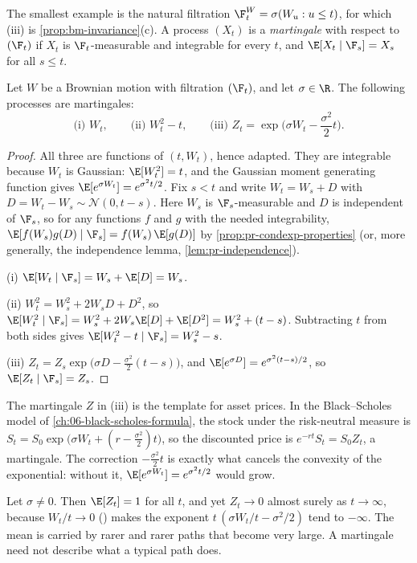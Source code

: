 The smallest example is the natural filtration $\F^W_t=\sigma(W_u:u\le t)$, for which
(iii) is \cref{prop:bm-invariance}(c). A process $(X_t)$ is a \emph{martingale} with
respect to $(\F_t)$ if $X_t$ is $\F_t$-measurable and integrable for every $t$, and
$\E[X_t\mid\F_s]=X_s$ for all $s\le t$.

\begin{theorem}\label{thm:bm-martingales}
Let $W$ be a Brownian motion with filtration $(\F_t)$, and let $\sigma\in\R$. The
following processes are martingales:
\[
  \text{(i) } W_t,\qquad
  \text{(ii) } W_t^2-t,\qquad
  \text{(iii) } Z_t=\exp\!\Big(\sigma W_t-\frac{\sigma^2}{2}t\Big).
\]
\end{theorem}

\begin{proof}
All three are functions of $(t,W_t)$, hence adapted. They are integrable because $W_t$
is Gaussian: $\E[W_t^2]=t$, and the Gaussian moment generating function gives
$\E[e^{\sigma W_t}]=e^{\sigma^2t/2}$. Fix $s<t$ and write $W_t=W_s+D$ with
$D=W_t-W_s\sim\mathcal N(0,t-s)$. Here $W_s$ is $\F_s$-measurable and $D$ is independent
of $\F_s$, so for any functions $f$ and $g$ with the needed integrability,
$\E[f(W_s)g(D)\mid\F_s]=f(W_s)\,\E[g(D)]$ by \cref{prop:pr-condexp-properties} (or, more
generally, the independence lemma, \cref{lem:pr-independence}).

(i) $\E[W_t\mid\F_s]=W_s+\E[D]=W_s$.

(ii) $W_t^2=W_s^2+2W_sD+D^2$, so $\E[W_t^2\mid\F_s]=W_s^2+2W_s\E[D]+\E[D^2]=W_s^2+(t-s)$.
Subtracting $t$ from both sides gives $\E[W_t^2-t\mid\F_s]=W_s^2-s$.

(iii) $Z_t=Z_s\exp\big(\sigma D-\frac{\sigma^2}{2}(t-s)\big)$, and
$\E[e^{\sigma D}]=e^{\sigma^2(t-s)/2}$, so $\E[Z_t\mid\F_s]=Z_s$.
\end{proof}

\begin{remark}\label{rem:bm-exp}
The martingale $Z$ in (iii) is the template for asset prices. In the Black--Scholes
model of \cref{ch:06-black-scholes-formula}, the stock under the risk-neutral measure is
$S_t=S_0\exp\big(\sigma W_t+(r-\frac{\sigma^2}2)t\big)$, so the discounted price is
$e^{-rt}S_t=S_0Z_t$, a martingale. The correction $-\frac{\sigma^2}{2}t$ is exactly what
cancels the convexity of the exponential: without it, $\E[e^{\sigma W_t}]=e^{\sigma^2t/2}$
would grow.
\end{remark}

\begin{remark}\label{rem:bm-dies}
Let $\sigma\neq0$. Then $\E[Z_t]=1$ for all $t$, and yet $Z_t\to0$ almost surely as
$t\to\infty$, because
$W_t/t\to0$ () makes the exponent
$t\,(\sigma W_t/t-\sigma^2/2)$ tend to $-\infty$. The mean is carried by rarer and rarer
paths that become very large. A martingale need not describe what a typical path does.
\end{remark}

